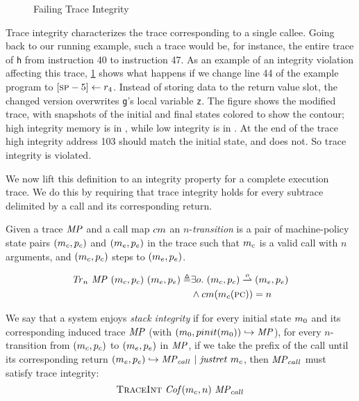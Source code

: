 \documentclass[acmsmall,review,anonymous]{acmart}\settopmatter{printfolios=true,printccs=false,printacmref=false}
\begin{document}
\begin{figure}
  \integrityexample
  \caption{Failing Trace Integrity}
  \label{fig:intex}
\end{figure}

Trace integrity characterizes the trace corresponding to a single
callee.
Going back to our running example, such a trace would be, for
instance, the entire trace of {\tt h} from instruction 40 to
instruction 47.
As an example of an integrity violation affecting this trace, \cref{fig:intex} shows what happens
if we change line 44 of the example program to $[\textsc{sp} - 5] \leftarrow r_4$.
Instead of storing data to the return value slot,
the changed version overwrites {\tt g}'s local variable {\tt z}.
The figure shows the modified trace, with snapshots of the initial
and final states colored to show the contour; high
integrity memory is in \high, while low integrity is in \low.
At the end of the trace high integrity address 103 should match the initial
state, and does not. So trace integrity is violated.

We now lift this definition to an integrity property for a complete
execution trace. We do this by requiring that trace integrity holds
for every subtrace delimited by a call and its corresponding return.

 Given a trace \(\mathit{MP}\) and a call map \(cm\)
an \(n\)-{\em transition} is a pair of
machine-policy state pairs \((m_c,p_c)\) and
\((m_e,p_e)\) in the trace such that
\(m_c\) is a valid call with \(n\) arguments, and
\((m_c,p_c)\) steps to \((m_e,p_e)\).


  \[\begin{split}
    \mathit{Tr}_n ~ \mathit{MP} ~ (m_c,p_c) ~ (m_e,p_e)
    \triangleq & \exists o.
    ~ (m_c,p_c) \overset{o}{\rightharpoonup} (m_e,p_e) \\
    & \land cm(m_c(\textsc{pc})) = n
  \end{split}\]


We say that a system enjoys {\em stack integrity} if for every initial
state $m_0$ and its corresponding induced trace $\mathit{MP}$ (with
$(m_0,pinit(m_0)) \hookrightarrow \mathit{MP}$), for every
$n$-transition from $(m_c,p_c)$ to
$(m_e,p_e)$ in $\mathit{MP}$, if we take the prefix of the
call until its corresponding return $(m_e,p_e)
\hookrightarrow \mathit{MP}_{call} ~ | ~ \mathit{justret}\ m_c$, then $\mathit{MP}_{call}$ must
satisfy trace integrity:
\[\text{\sc TraceInt} ~ \mathit{Cof}(m_c,n) ~ \mathit{MP}_{call}\]
\end{document}
